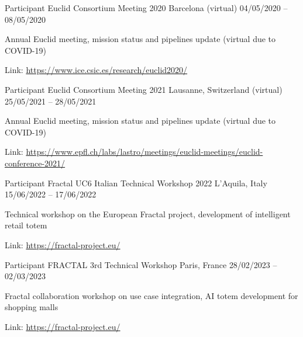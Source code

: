 \begin{cventries}
\cventry
{Participant} %
{Euclid Consortium Meeting 2020} %
{Barcelona (virtual)} %
{04/05/2020 -- 08/05/2020} %
{ %
\begin{cvitems}
  \item {Annual Euclid meeting, mission status and pipelines update (virtual due to COVID-19)}
  \item {Link: \url{https://www.ice.csic.es/research/euclid2020/}}
\end{cvitems}
}


\cventry
{Participant} %
{Euclid Consortium Meeting 2021} %
{Lausanne, Switzerland (virtual)} %
{25/05/2021 -- 28/05/2021} %
{ %
\begin{cvitems}
  \item {Annual Euclid meeting, mission status and pipelines update (virtual due to COVID-19)}
  \item {Link: \url{https://www.epfl.ch/labs/lastro/meetings/euclid-meetings/euclid-conference-2021/}}
\end{cvitems}
}


\cventry
{Participant} %
{Fractal UC6 Italian Technical Workshop 2022} %
{L'Aquila, Italy} %
{15/06/2022 -- 17/06/2022} %
{ %
\begin{cvitems}
  \item {Technical workshop on the European Fractal project, development of intelligent retail totem}
  \item {Link: \url{https://fractal-project.eu/}}
\end{cvitems}
}


\cventry
{Participant} %
{FRACTAL 3rd Technical Workshop} %
{Paris, France} %
{28/02/2023 -- 02/03/2023} %
{ %
\begin{cvitems}
  \item {Fractal collaboration workshop on use case integration, AI totem development for shopping malls}
  \item {Link: \url{https://fractal-project.eu/}}
\end{cvitems}
}


\end{cventries}
